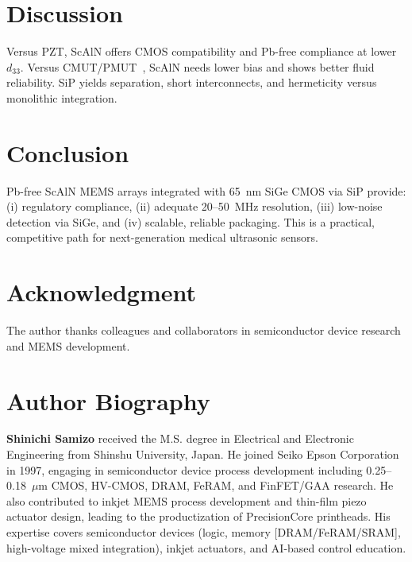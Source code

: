 \documentclass[conference]{IEEEtran}
\begin{document}
\section{Discussion}
Versus PZT, ScAlN offers CMOS compatibility and Pb-free compliance at lower $d_{33}$. Versus CMUT/PMUT~\cite{khuri2009cmut}, ScAlN needs lower bias and shows better fluid reliability. SiP yields separation, short interconnects, and hermeticity versus monolithic integration.

\section{Conclusion}
Pb-free ScAlN MEMS arrays integrated with 65~nm SiGe CMOS via SiP provide: (i) regulatory compliance, (ii) adequate 20--50~MHz resolution, (iii) low-noise detection via SiGe, and (iv) scalable, reliable packaging. This is a practical, competitive path for next-generation medical ultrasonic sensors.

\section*{Acknowledgment}
The author thanks colleagues and collaborators in semiconductor device research and MEMS development.




\section*{Author Biography}
\textbf{Shinichi Samizo} received the M.S. degree in Electrical and Electronic Engineering from Shinshu University, Japan. He joined Seiko Epson Corporation in 1997, engaging in semiconductor device process development including 0.25--0.18~$\mu$m CMOS, HV-CMOS, DRAM, FeRAM, and FinFET/GAA research. He also contributed to inkjet MEMS process development and thin-film piezo actuator design, leading to the productization of PrecisionCore printheads. His expertise covers semiconductor devices (logic, memory [DRAM/FeRAM/SRAM], high-voltage mixed integration), inkjet actuators, and AI-based control education.
\end{document}
